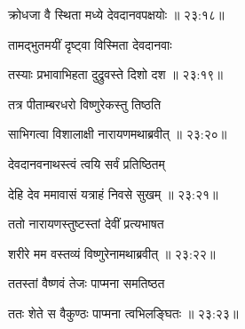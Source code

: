 
{\devanagarifont क्रोधजा वै स्थिता मध्ये देवदानवपक्षयोः {॥ २३:१८॥} \veg\dontdisplaylinenum }%
 
{\devanagarifont तामद्भुतमयीं दृष्ट्वा विस्मिता देवदानवाः \thinspace{\dandab} \dontdisplaylinenum }%


{\devanagarifont तस्याः प्रभावाभिहता दुद्रुवस्ते दिशो दश {॥ २३:१९॥} \veg\dontdisplaylinenum }%

{\devanagarifont तत्र पीताम्बरधरो विष्णुरेकस्तु तिष्ठति \thinspace{\dandab} \dontdisplaylinenum }%


{\devanagarifont साभिगत्वा विशालाक्षी नारायणमथाब्रवीत् {॥ २३:२०॥} \veg\dontdisplaylinenum }%

{\devanagarifont देवदानवनाथस्त्वं त्वयि सर्वं प्रतिष्ठितम् \thinspace{\dandab} \dontdisplaylinenum }%


{\devanagarifont देहि देव ममावासं यत्राहं निवसे सुखम् {॥ २३:२१॥} \veg\dontdisplaylinenum }%
 
{\devanagarifont ततो नारायणस्तुष्टस्तां देवीं प्रत्यभाषत \thinspace{\dandab} \dontdisplaylinenum }%
 

{\devanagarifont शरीरे मम वस्तव्यं विष्णुरेनामथाब्रवीत् {॥ २३:२२॥} \veg\dontdisplaylinenum }%

{\devanagarifont ततस्तां वैष्णवं तेजः पाप्मना समतिष्ठत \thinspace{\dandab} \dontdisplaylinenum }%


{\devanagarifont ततः शेते स वैकुण्ठः पाप्मना त्वभिलङ्घितः {॥ २३:२३॥} \veg\dontdisplaylinenum }%

